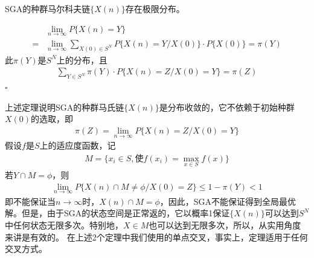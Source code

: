         \begin{theorem}
        SGA的种群马尔科夫链$\{X(n)\}$存在极限分布。
        \end{theorem}
        \begin{Proof}
        \begin{align*}
        & \mathop{\lim}\limits_{n\to \infty}P\{X(n)=Y\}\\
         = {}&\mathop{\lim}\limits_{n\to \infty}\mathop{\sum}\limits_{X(0)\in S^N}P\{X(n)=Y/X(0)\}\cdot P\{X(0)\}=\pi(Y)
        \end{align*}
        此$\pi(Y)$是$S^N$上的分布，且
        \begin{align*}
        \mathop{\sum}\limits_{Y\in S^N}\pi(Y)\cdot P\{X(n)=Z/X(0)=Y\}=\pi (Z)
        \end{align*}
        $\square$
        \end{Proof}
        \par
        上述定理说明SGA的种群马氏链$\{X(n)\}$是分布收敛的，它不依赖于初始种群$X(0)$的选取，即
        \begin{align*}
        \pi (Z)=\mathop{\lim}\limits_{n\to \infty}P\{X(n)=Z/X(0)=Y\}
        \end{align*}
        假设$f$是$S$上的适应度函数，记
        \begin{align*}
        M=\{x_i\in S,\text{使}f(x_i)=\mathop{\max}\limits_{x\in S}f(x)\}
        \end{align*}
        若$Y\cap M= \phi$，则
        \begin{align*}
        \mathop{\lim}\limits_{n\to \infty}P\{X(n)\cap M\neq \phi /X(0)=Z\} \leqslant 1-\pi (Y)<1
        \end{align*}
        即不能保证当$n\to \infty$时，$X(n)\cap M =\phi$，因此，SGA不能保证得到全局最优解。但是，由于SGA的状态空间是正常返的，它以概率1保证$\{X(n)\}$可以达到$S^N$中任何状态无限多次。特别地，$X \in M$也可以达到无限多次，所以，从实用角度来讲是有效的。
        在上述2个定理中我们使用的单点交叉，事实上，定理适用于任何交叉方式。
